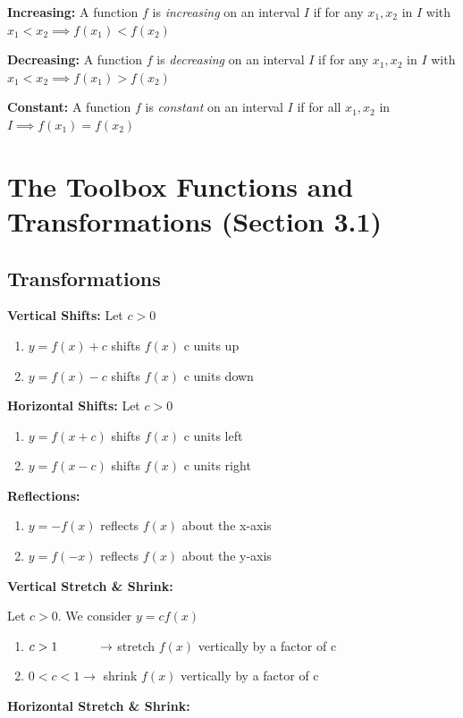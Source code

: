 \documentclass[12pt]{article}
\begin{document}
\textbf{Increasing:} A function $f$ is \textit{increasing} on an interval $I$ if for any $x_{1}, x_{2}$ in $I$ with $x_{1} < x_{2} \implies f(x_{1}) < f(x_{2})$

\textbf{Decreasing:} A function $f$ is \textit{decreasing} on an interval $I$ if for any $x_{1}, x_{2}$ in $I$ with $x_{1} < x_{2} \implies f(x_{1}) > f(x_{2})$

\textbf{Constant:} A function $f$ is \textit{constant} on an interval $I$ if for all $x_{1}, x_{2}$ in $I \implies  f(x_{1}) = f(x_{2})$

\section{The Toolbox Functions and Transformations (Section 3.1)}

\subsection{Transformations}

\textbf{Vertical Shifts:} Let $c>0$

\begin{enumerate}
\item $y=f(x) + c$ shifts $f(x)$ c units up
\item $y=f(x) - c$ shifts $f(x)$ c units down
\end{enumerate}

\textbf{Horizontal Shifts:} Let $c>0$

\begin{enumerate}
\item $y=f(x+c)$ shifts $f(x)$ c units left
\item $y=f(x-c)$ shifts $f(x)$ c units right
\end{enumerate}

\textbf{Reflections:} 

\begin{enumerate}
\item $y=-f(x)$ reflects $f(x)$ about the x-axis
\item $y=f(-x)$ reflects $f(x)$ about the y-axis
\end{enumerate}

\textbf{Vertical Stretch \& Shrink:} 
\newline

\centerline{Let $c>0$. We consider $y=cf(x)$}

\begin{enumerate}
\item $c>1 \hspace{1.1cm} \to$ stretch $f(x)$ vertically by a factor of c
\item $0<c<1 \to$ shrink $f(x)$ vertically by a factor of c
\end{enumerate}
\vspace{.5cm}
\textbf{Horizontal Stretch \& Shrink:} 
\newline
\end{document}
